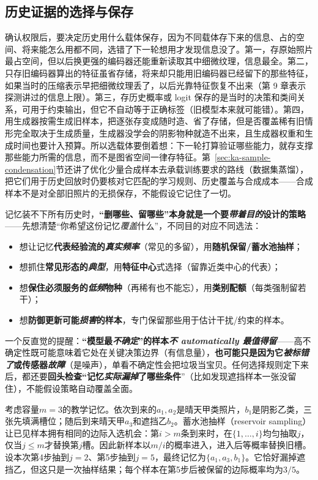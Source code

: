 \subsection{历史证据的选择与保存}
\label{sec:ket-update-memory}

确认权限后，要决定历史用什么载体保存，因为不同载体存下来的信息、占的空间、将来能怎么用都不同，选错了下一轮想用才发现信息没了。第一，存原始照片最占空间，但以后换更强的编码器还能重新读取其中细微纹理，信息最全。第二，只存旧编码器算出的特征虽省存储，将来却只能用旧编码器已经留下的那些特征，如果当时的压缩表示早把细微纹理丢了，以后光靠特征恢复不出来（第 9 章表示探测讲过的信息上限）。第三，存历史概率或 logit 保存的是当时的决策和类间关系，可用于约束输出，但它不自动等于正确标签（旧模型本来就可能错）。第四，用生成器按需生成旧样本，把逐张存变成随时造、省了存储，但是否覆盖稀有旧情形完全取决于生成质量，生成器没学会的阴影物种就造不出来，且生成器权重和生成时间也要计入预算。所以选载体要倒着想：下一轮打算验证哪些能力，就存支撑那些能力所需的信息，而不是图省空间一律存特征。第~\ref{sec:ka-sample-condensation}节还讲了优化少量合成样本去承载训练要求的路线（数据集蒸馏），把它们用于历史回放时仍要核对它匹配的学习规则、历史覆盖与合成成本——合成样本不是对全部旧照片的无损保存，不能假设它记住了一切。

记忆装不下所有历史时，\textbf{“删哪些、留哪些”本身就是一个要\emph{带着目的}设计的策略}——先想清楚“你希望这份记忆\emph{覆盖}什么”，不同目的对应不同选法：
\begin{itemize}\item 想让记忆\textbf{代表经验流的\emph{真实频率}}（常见的多留），用\textbf{随机保留/蓄水池抽样}；\item 想抓住\textbf{常见形态的\emph{典型}}，用\textbf{特征中心}式选择（留靠近类中心的代表）；\item 想\textbf{保住必须服务的\emph{低频}物种}（再稀有也不能忘），用\textbf{类别配额}（每类强制留若干）；\item 想\textbf{防御更新可能\emph{损害}的样本}，专门保留那些用于估计干扰/约束的样本。\end{itemize}
一个反直觉的提醒：\textbf{“模型最\emph{不确定}”的样本\emph{不 automatically 最值得留}}——高不确定性既可能意味着它处在关键决策边界（有信息量），\textbf{也可能只是因为它\emph{被标错了}或传感器\emph{故障}}（是噪声），单看不确定性会把垃圾当宝贝。任何选择规则定下来后，都还要\textbf{回头检查“记忆\emph{实际漏掉}了哪些条件}”（比如发现遮挡样本一张没留住），不能假设策略自动覆盖全面。

考虑容量$m=3$的教学记忆。依次到来的$a_1,a_2$是晴天甲类照片，$b_1$是阴影乙类，三张先填满槽位；随后到来晴天甲$a_3$和遮挡乙$b_2$。蓄水池抽样（reservoir sampling）让已见样本拥有相同的边际入选机会：第$i>m$条到来时，在$\{1,\ldots,i\}$均匀抽取$j$，仅当$j\leq m$才替换第$j$槽。因此新样本以$m/i$的概率进入，进入后等概率替换旧槽。设本次第4步抽到$j=2$、第5步抽到$j=5$，最终记忆为$\{a_1,a_3,b_1\}$。它恰好漏掉遮挡乙，但这只是一次抽样结果；每个样本在第5步后被保留的边际概率均为$3/5$。

